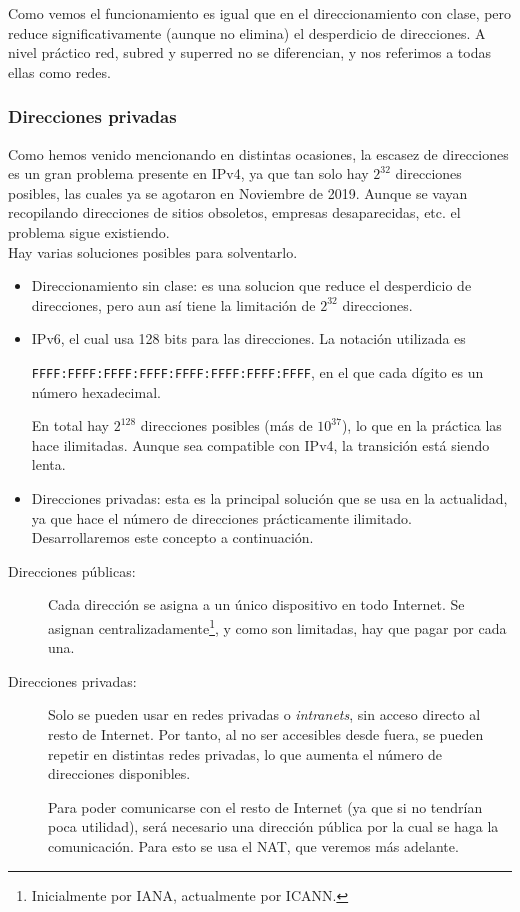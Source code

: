 Como vemos el funcionamiento es igual que en el direccionamiento con clase, pero reduce significativamente (aunque no elimina) el desperdicio de direcciones. A nivel práctico red, subred y superred no se diferencian, y nos referimos a todas ellas como redes.

\subsubsection{Direcciones privadas}

Como hemos venido mencionando en distintas ocasiones, la escasez de direcciones es un gran problema presente en \acrshort{IPv4}, ya que tan solo hay $2^{32}$ direcciones posibles, las cuales ya se agotaron en Noviembre de 2019. Aunque se vayan recopilando direcciones de sitios obsoletos, empresas desaparecidas, etc. el problema sigue existiendo.\\

Hay varias soluciones posibles para solventarlo.
\begin{itemize}
    \item Direccionamiento sin clase: es una solucion que reduce el desperdicio de direcciones, pero aun así tiene la limitación de $2^{32}$ direcciones.
    \item \acrshort{IPv6}, el cual usa 128 bits para las direcciones. La notación utilizada es\

        \verb|FFFF:FFFF:FFFF:FFFF:FFFF:FFFF:FFFF:FFFF|, en el que cada dígito es un número hexadecimal.

    En total hay $2^{128}$ direcciones posibles (más de $10^{37}$), lo que en la práctica las hace ilimitadas. Aunque sea compatible con \acrshort{IPv4}, la transición está siendo lenta.
    \item Direcciones privadas: esta es la principal solución que se usa en la actualidad, ya que hace el número de direcciones prácticamente ilimitado. Desarrollaremos este concepto a continuación.
\end{itemize}

\begin{description}
    \item [Direcciones públicas:] Cada dirección se asigna a un único dispositivo en todo Internet. Se asignan centralizadamente\footnote{Inicialmente por \acrshort{IANA}, actualmente por \acrshort{ICANN}.}, y como son limitadas, hay que pagar por cada una.
    \item [Direcciones privadas:] Solo se pueden usar en redes privadas o \textit{intranets}, sin acceso directo al resto de Internet. Por tanto, al no ser accesibles desde fuera, se pueden repetir en distintas redes privadas, lo que aumenta el número de direcciones disponibles.
    
    Para poder comunicarse con el resto de Internet (ya que si no tendrían poca utilidad), será necesario una dirección pública por la cual se haga la comunicación. Para esto se usa el \acrshort{NAT}, que veremos más adelante.
\end{description}

